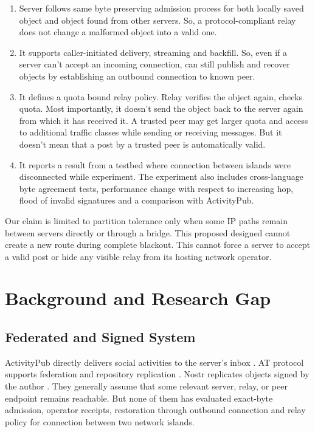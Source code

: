 \documentclass[conference,a4paper]{IEEEtran}
\begin{document}
\begin{enumerate}
  \item Server follows same byte preserving admission process for both locally saved object and object found from other servers. So, a protocol-compliant relay does not change a malformed object into a valid one.
  \item It supports caller-initiated delivery, streaming and backfill. So, even if a server can’t accept an incoming connection, can still publish and recover objects by establishing an outbound connection to known peer.
  \item It defines a quota bound relay policy. Relay verifies the object again, checks quota. Most importantly, it doesn’t send the object back to the server again from which it has received it. A trusted peer may get larger quota and access to additional traffic classes while sending or receiving messages. But it doesn’t mean that a post by a trusted peer is automatically valid.
  \item It reports a result from a testbed where connection between islands were disconnected while experiment. The experiment also includes cross-language byte agreement tests, performance change with respect to increasing hop, flood of invalid signatures and a comparison with ActivityPub.
\end{enumerate}

Our claim is limited to partition tolerance only when some IP paths remain between servers directly or through a bridge. This proposed designed cannot create a new route during complete blackout. This cannot force a server to accept a valid post or hide any visible relay from its hosting network operator.

\section{Background and Research Gap}
\label{sec:background}

\subsection{Federated and Signed System}

ActivityPub directly delivers social activities to the server’s inbox \cite{activitypub}. AT protocol supports federation and repository replication \cite{atproto}. Nostr replicates objects signed by the author \cite{nostr}.  They generally assume that some relevant server, relay, or peer endpoint remains reachable. But none of them has evaluated exact-byte admission, operator receipts, restoration through outbound connection and relay policy for connection between two network islands.
\end{document}
